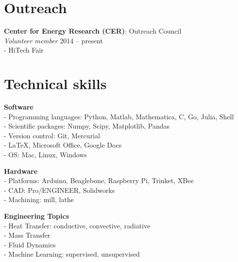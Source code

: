 \documentclass[]{res}
\begin{document}
\begin{resume}
\section{Outreach}
%

\textbf{Center for Energy Research (CER)}: Outreach Council \\
\textit{Volunteer member} \hfill 2014 -- present \\
- HiTech Fair


\section{Technical skills}
\vspace{0.1in}

\textbf{Software} \\
- Programming languages: Python, Matlab, Mathematica, C, Go, Julia, Shell \\
- Scientific packages: Numpy, Scipy, Matplotlib, Pandas \\
- Version control: Git, Mercurial \\
- LaTeX, Microsoft Office, Google Docs \\
- OS: Mac, Linux, Windows \\

\vspace{-0.2in}

\textbf{Hardware} \\
- Platforms: Arduino, Beaglebone, Raspberry Pi, Trinket, XBee \\
- CAD: Pro/ENGINEER, Solidworks \\
- Machining: mill, lathe \\

\vspace{-0.2in}

\textbf{Engineering Topics} \\
- Heat Transfer: conductive, convective, radiative \\
- Mass Transfer \\
- Fluid Dynamics \\
- Machine Learning: supervised, unsupervised \\


\end{resume}
\end{document}

